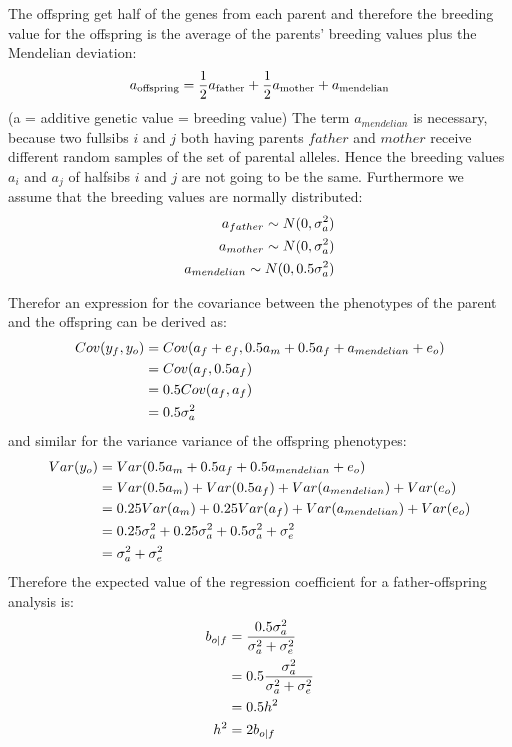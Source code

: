 \documentclass[
]{book}
\begin{document}
The offspring get half of the genes from each parent and therefore the breeding value for the offspring is the average of the parents' breeding values plus the Mendelian deviation:
\begin{align}
        a_{\text{offspring}}=\frac{1}{2}a_{\text{father}}+\frac{1}{2}a_{\text{mother}}+a_{\text{mendelian}} \notag  
\end{align}
(a = additive genetic value = breeding value)
The term \(a_{mendelian}\) is necessary, because two fullsibs \(i\) and \(j\) both having parents \(father\) and \(mother\) receive different random samples of the set of parental alleles. Hence the breeding values \(a_i\) and \(a_j\) of halfsibs \(i\) and \(j\) are not going to be the same.
Furthermore we assume that the breeding values are normally distributed:
\begin{align}
a_{father} \sim N(0,\sigma^2_{a}) \notag \\
a_{mother} \sim N(0,\sigma^2_{a}) \notag \\
a_{mendelian} \sim N(0,0.5\sigma^2_{a}) \notag \\
\end{align}

Therefor an expression for the covariance between the phenotypes of the parent and the offspring can be derived as:\\
\begin{align}
            Cov(y_f,y_o) &= Cov(a_f+e_f,0.5a_m+0.5a_f+a_{mendelian}+e_o) \notag \\
                         &= Cov(a_f,0.5a_f) \notag \\
                         &= 0.5Cov(a_f,a_f) \notag \\
                         &= 0.5\sigma_a^2 \notag 
\end{align}
and similar for the variance variance of the offspring phenotypes:\\
\begin{align}
            Var(y_o) &= Var(0.5a_m+0.5a_f+0.5a_{mendelian}+e_o) \notag \\
                     &= Var(0.5a_m) + Var(0.5a_f) + Var(a_{mendelian}) + Var(e_o) \notag \\
                     &= 0.25Var(a_m) + 0.25Var(a_f) + Var(a_{mendelian}) + Var(e_o) \notag \\
                     &= 0.25\sigma_a^2 + 0.25\sigma_a^2 + 0.5\sigma_a^2 + \sigma_e^2 \notag \\
                     &= \sigma_a^2 + \sigma_e^2 \notag
\end{align}
Therefore the expected value of the regression coefficient for a father-offspring analysis is:
\begin{align}
            b_{o|f} &= \frac{0.5\sigma_a^2}{\sigma_a^2 + \sigma_e^2} \notag \\
                    &= 0.5\frac{\sigma_a^2}{\sigma_a^2 + \sigma_e^2} \notag \\
                    &= 0.5h^2 \notag \\
            h^2     &= 2b_{o|f}\notag
\end{align}
\end{document}
